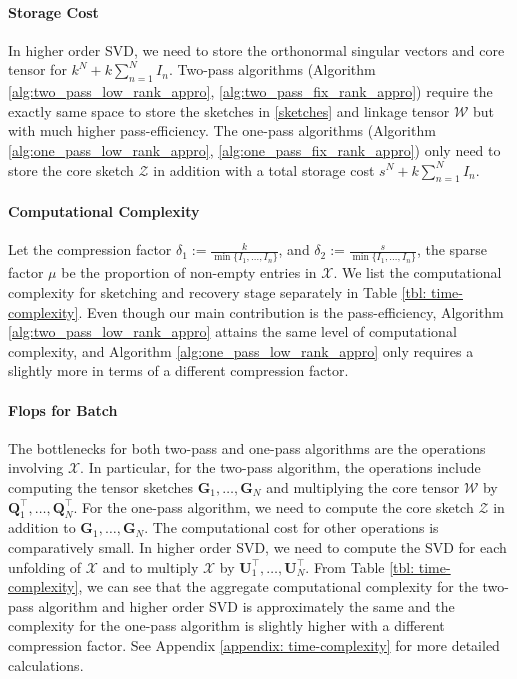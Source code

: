 \paragraph{Storage Cost} In higher order SVD, we need to store the orthonormal singular vectors and core tensor for $k^N+k\sum_{n=1}^N I_n$. Two-pass algorithms (Algorithm \ref{alg:two_pass_low_rank_appro}, \ref{alg:two_pass_fix_rank_appro}) require the exactly same space to store the sketches in \eqref{sketches} and linkage tensor $\mathscr{W}$ but with much higher pass-efficiency. The one-pass algorithms (Algorithm  \ref{alg:one_pass_low_rank_appro},  \ref{alg:one_pass_fix_rank_appro}) only need to store the core sketch $\mathscr{Z}$ in addition with a total storage cost $s^N+k\sum_{n=1}^N I_n$. 

\paragraph{Computational Complexity}

Let the compression factor $\delta_1:= \frac{k}{\min\{I_1, \dots, I_n\}}$, and $\delta_2 := \frac{s}{\min\{I_1, \dots, I_n \}}$, the sparse factor $\mu$ be the proportion of non-empty entries in $\mathscr{X}$. We list the computational complexity for sketching and recovery stage separately in Table \ref{tbl: time-complexity}. Even though our main contribution is the pass-efficiency, Algorithm \ref{alg:two_pass_low_rank_appro} attains the same level of computational complexity, and Algorithm \ref{alg:one_pass_low_rank_appro} only requires a slightly more in terms of a different compression factor. 



\iffalse 
\paragraph{Flops for Batch} 
The bottlenecks for both two-pass and one-pass algorithms are the operations involving $\mathscr{X}$. In particular, for the two-pass algorithm, the operations include computing the tensor sketches $\mathbf{G}_1, \dots, \mathbf{G}_N$ and multiplying the core tensor $\mathscr{W}$ by $\mathbf{Q}^\top_1, \dots, \mathbf{Q}_N^\top$. For the one-pass algorithm, we need to compute the core sketch $\mathscr{Z}$ in addition to $\mathbf{G}_1, \dots, \mathbf{G}_N$. The computational cost for other operations is comparatively small. In higher order SVD, we need to compute the SVD for each unfolding of $\mathscr{X}$ and to multiply $\mathscr{X}$ by $\mathbf{U}_1^\top, \dots, \mathbf{U}_N^\top$. From Table \ref{tbl: time-complexity}, we can see that the aggregate computational complexity for the two-pass algorithm and higher order SVD is approximately the same and the complexity for the one-pass algorithm is slightly higher with a different compression factor. See Appendix \ref{appendix: time-complexity} for more detailed calculations. 
